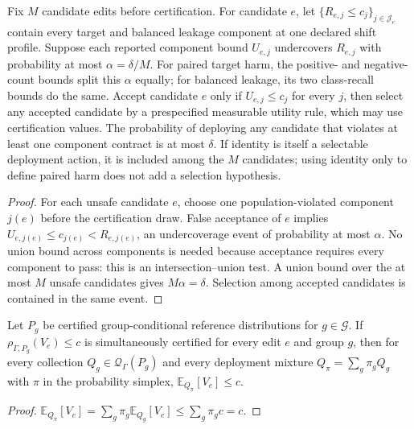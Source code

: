 \begin{theorem}
\label{thm:iut}
Fix $M$ candidate edits before certification. For candidate $e$, let
$\{R_{e,j}\leq c_j\}_{j\in\mathcal J_e}$ contain every target and balanced
leakage component at one declared shift profile. Suppose each reported
component bound $U_{e,j}$ undercovers $R_{e,j}$ with probability at most
$\alpha=\delta/M$. For paired target harm, the positive- and negative-count
bounds split this $\alpha$ equally; for balanced leakage, its two class-recall
bounds do the same. Accept candidate $e$ only if
$U_{e,j}\leq c_j$ for every $j$, then select any accepted candidate by a
prespecified measurable utility rule, which may use certification values. The
probability of deploying any candidate that violates at least one component
contract is at most $\delta$.
If identity is itself a selectable deployment action, it is included among the
$M$ candidates; using identity only to define paired harm does not add a
selection hypothesis.
\end{theorem}

\begin{proof}
For each unsafe candidate $e$, choose one population-violated component
$j(e)$ before the certification draw. False acceptance of $e$ implies
$U_{e,j(e)}\leq c_{j(e)}<R_{e,j(e)}$, an undercoverage event of probability at
most $\alpha$. No union bound across components is needed because acceptance
requires every component to pass: this is an intersection--union test. A union
bound over the at most $M$ unsafe candidates gives $M\alpha=\delta$.
Selection among accepted candidates is contained in the same event.
\end{proof}

\begin{corollary}
\label{cor:mixture}
Let $P_g$ be certified group-conditional reference distributions for
$g\in\mathcal{G}$. If
$\rho_{\Gamma,P_g}(V_e)\leq c$ is simultaneously certified for every edit
$e$ and group $g$, then for every collection
$Q_g\in\mathcal{Q}_{\Gamma}(P_g)$ and every deployment mixture
$Q_{\pi}=\sum_g\pi_gQ_g$ with $\pi$ in the probability simplex,
$\mathbb{E}_{Q_{\pi}}[V_e]\leq c$.
\end{corollary}

\begin{proof}
$\mathbb{E}_{Q_{\pi}}[V_e]=\sum_g\pi_g\mathbb{E}_{Q_g}[V_e]\leq
\sum_g\pi_gc=c$.
\end{proof}


